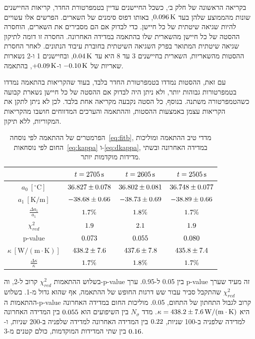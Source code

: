 \documentclass[10pt,a4paper]{article}
\newcommand{\textenglish}[1]{\foreignlanguage{english}{#1}}
\newcommand{\U}[1]{\,\mathrm{#1}}
\begin{document}
בקריאה הראשונה של חלק ב׳, כשכל החיישנים עדיין בטמפרטורת החדר, קריאות החיישנים שונות מהממוצע שלהן בעד $\DOffsetMax\U{K}$, באותו דפוס סימנים של השארים. הפרשים אלו עשויים להיות שגיאה שיטתית של כל חיישן. כדי לבדוק אם הם מסבירים את השארים, הוחסרה ההסטה של כל חיישן מהשארית שלו בהתאמה במדידה האחרונה. החסרה זו דומה לתיקון שגיאה שיטתית המתואר בפרק השגיאה השיטתית בחוברת עיבוד הנתונים. לאחר החסרת ההסטות מהשאריות, השארית בחיישנים 3 עד 8 היא עד $\DCorrRestMax\U{K}$, ובחיישנים 1 ו-2 נשארות שאריות של $-\DCorrOne\U{K}$ ו-$+\DCorrTwo\U{K}$, בהתאמה.

עם זאת, ההסטות נמדדו בטמפרטורת החדר בלבד, בעוד שהקריאות בהתאמה נמדדו בטמפרטורות גבוהות יותר, ולא ניתן היה לבדוק אם ההסטה של כל חיישן נשארת קבועה כשהטמפרטורה משתנה. בנוסף, כל הסטה נקבעה מקריאה אחת בלבד. לכן לא ניתן לתקן את הקריאות עצמן באמצעות ההסטות, וההתאמה והערכים המדווחים חושבו מהקריאות המקוריות, ללא תיקון.

\begin{table}[H]
  \centering
  \renewcommand{\arraystretch}{1.3}
  \begin{tabular}{|c|c|c|c|}
    \hline
     & $t = \BLastTime\U{s}$ & $t = \BMidTime\U{s}$ & $t = \BEarlyTime\U{s}$ \\
    \hline
    $a_0\ [^\circ\mathrm{C}]$ & $36.827 \pm 0.078$ & $36.802 \pm 0.081$ & $36.748 \pm 0.077$ \\
    \hline
    $a_1\ [\mathrm{K/m}]$ & $-38.68 \pm 0.66$ & $-38.73 \pm 0.69$ & $-38.89 \pm 0.66$ \\
    \hline
    $\frac{\Delta a_1}{a_1}$ & $1.7\%$ & $1.8\%$ & $1.7\%$ \\
    \hline
    $\chi^2_{red}$ & $1.9$ & $2.1$ & $1.9$ \\
    \hline
    \textenglish{p-value} & $0.073$ & $0.055$ & $0.080$ \\
    \hline
    $\kappa\ [\mathrm{W/(m\cdot K)}]$ & $438.2 \pm 7.6$ & $437.6 \pm 7.8$ & $435.8 \pm 7.4$ \\
    \hline
    $\frac{\Delta\kappa}{\kappa}$ & $1.7\%$ & $1.8\%$ & $1.7\%$ \\
    \hline
  \end{tabular}
  \caption{הפרמטרים של ההתאמה לפי נוסחה~\eqref{eq:fitb}, מדדי טיב ההתאמה ומוליכות החום לפי נוסחאות~\eqref{eq:kappa} ו-\eqref{eq:dkappa}, במדידה האחרונה ובשתי מדידות מוקדמות יותר.}
  \label{tab:b-results}
\end{table}
בשלוש ההתאמות $\chi^2_{red}$ קרוב ל-2, וה-\textenglish{p-value} בין 0.05 ל-0.95. ערך \textenglish{p-value} זה מעיד שערך $\chi^2_{red}$ שהתקבל סביר עבור שש דרגות החופש של ההתאמה, אף שהוא גדול מ-1. בשלוש ההתאמות ה-\textenglish{p-value} קרוב לגבול התחתון של התחום, 0.05. מוליכות החום במדידה האחרונה היא $\kappa = \BLastKappa\U{W/(m\cdot K)}$. מדד $N_\sigma$ בין השיפועים הוא $0.055$ בין המדידה האחרונה למדידה שלפניה ב-100 שניות, $0.22$ בין המדידה האחרונה למדידה שלפניה ב-200 שניות, ו-$0.16$ בין שתי המדידות המוקדמות, כולם קטנים מ-3.
\end{document}
